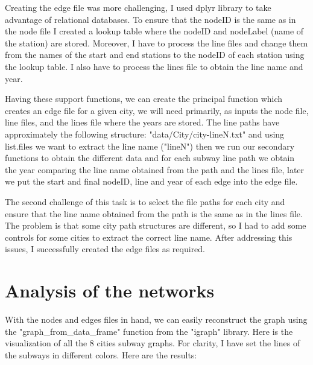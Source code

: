 Creating the edge file was more challenging, I used dplyr library to take advantage of relational databases. To ensure that the nodeID is the same as in the node file I created a lookup table where the nodeID and nodeLabel (name of the station) are stored. Moreover, I have to process the line files and change them from the names of the start and end stations to the nodeID of each station using the lookup table. I also have to process the lines file to obtain the line name and year. 

Having these support functions, we can create the principal function which creates an edge file for a given city, we will need primarily, as inputs the node file, line files, and the lines file where the years are stored. The line paths have approximately the following structure: "data/City/city-lineN.txt" and using list.files we want to extract the line name ("lineN") then we run our secondary functions to obtain the different data and for each subway line path we obtain the year comparing the line name obtained from the path and the lines file, later we put the start and final nodeID, line and year of each edge into the edge file.

The second challenge of this task is to select the file paths for each city and ensure that the line name obtained from the path is the same as in the lines file. The problem is that some city path structures are different, so I had to add some controls for some cities to extract the correct line name. After addressing this issues, I successfully created the edge files as required.


\section{Analysis of the networks}

With the nodes and edges files in hand, we can easily reconstruct the graph using the "graph\_from\_data\_frame" function from the "igraph" library. Here is the visualization of all the 8 cities subway graphs. For clarity, I have set the lines of the subways in different colors. Here are the results:


